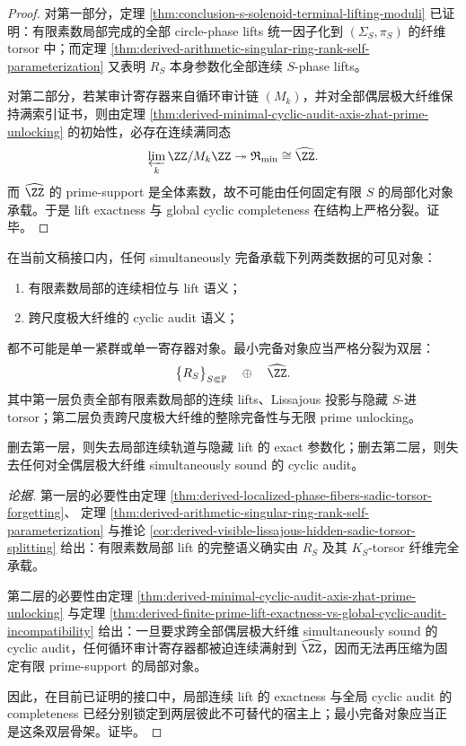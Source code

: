 \begin{proof}
对第一部分，定理 \ref{thm:conclusion-s-solenoid-terminal-lifting-moduli} 已证明：有限素数局部完成的全部 circle-phase lifts 统一因子化到 \((\Sigma_S,\pi_S)\) 的纤维 torsor 中；而定理 \ref{thm:derived-arithmetic-singular-ring-rank-self-parameterization} 又表明 \(R_S\) 本身参数化全部连续 \(S\)-phase lifts。

对第二部分，若某审计寄存器来自循环审计链 \((M_k)\)，并对全部偶层极大纤维保持满索引证书，则由定理 \ref{thm:derived-minimal-cyclic-audit-axis-zhat-prime-unlocking} 的初始性，必存在连续满同态
\[
\varprojlim_k \ZZ/M_k\ZZ \twoheadrightarrow \mathfrak R_{\min}\cong \widehat{\ZZ}.
\]
而 \(\widehat{\ZZ}\) 的 prime-support 是全体素数，故不可能由任何固定有限 \(S\) 的局部化对象承载。于是 lift exactness 与 global cyclic completeness 在结构上严格分裂。证毕。
\end{proof}

\begin{conjecture}\label{conj:derived-fold-prime-register-double-layer-minimal-completion}
在当前文稿接口内，任何 simultaneously 完备承载下列两类数据的可见对象：
\begin{enumerate}
\normalfont
  \item 有限素数局部的连续相位与 lift 语义；
  \item 跨尺度极大纤维的 cyclic audit 语义；
\end{enumerate}
都不可能是单一紧群或单一寄存器对象。最小完备对象应当严格分裂为双层：
\[
\bigl\{R_S\bigr\}_{S\Subset\mathbb P}
\quad\oplus\quad
\widehat{\ZZ}.
\]
其中第一层负责全部有限素数局部的连续 lifts、Lissajous 投影与隐藏 \(S\)-进 torsor；第二层负责跨尺度极大纤维的整除完备性与无限 prime unlocking。

删去第一层，则失去局部连续轨道与隐藏 lift 的 exact 参数化；删去第二层，则失去任何对全偶层极大纤维 simultaneously sound 的 cyclic audit。
\end{conjecture}

\begin{proof}[论据]
第一层的必要性由定理 \ref{thm:derived-localized-phase-fibers-sadic-torsor-forgetting}、
定理 \ref{thm:derived-arithmetic-singular-ring-rank-self-parameterization}
与推论 \ref{cor:derived-visible-lissajous-hidden-sadic-torsor-splitting} 给出：有限素数局部 lift 的完整语义确实由 \(R_S\) 及其 \(K_S\)-torsor 纤维完全承载。

第二层的必要性由定理 \ref{thm:derived-minimal-cyclic-audit-axis-zhat-prime-unlocking}
与定理 \ref{thm:derived-finite-prime-lift-exactness-vs-global-cyclic-audit-incompatibility} 给出：一旦要求跨全部偶层极大纤维 simultaneously sound 的 cyclic audit，任何循环审计寄存器都被迫连续满射到 \(\widehat{\ZZ}\)，因而无法再压缩为固定有限 prime-support 的局部对象。

因此，在目前已证明的接口中，局部连续 lift 的 exactness 与全局 cyclic audit 的 completeness 已经分别锁定到两层彼此不可替代的宿主上；最小完备对象应当正是这条双层骨架。证毕。
\end{proof}

